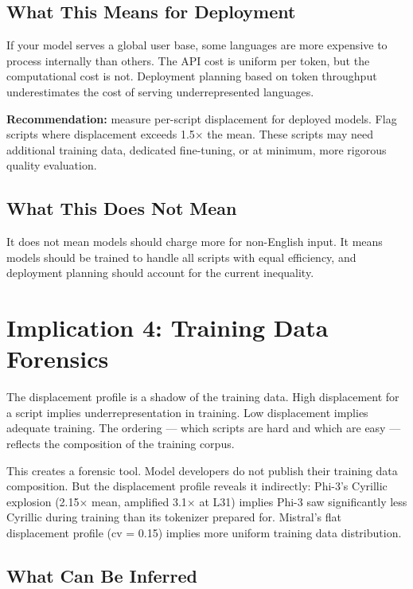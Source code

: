 \documentclass[11pt,a4paper]{article}
\begin{document}
\subsection{What This Means for Deployment}

If your model serves a global user base, some languages are more expensive to process internally than others. The API cost is uniform per token, but the computational cost is not. Deployment planning based on token throughput underestimates the cost of serving underrepresented languages.

\textbf{Recommendation:} measure per-script displacement for deployed models. Flag scripts where displacement exceeds 1.5$\times$ the mean. These scripts may need additional training data, dedicated fine-tuning, or at minimum, more rigorous quality evaluation.

\subsection{What This Does Not Mean}

It does not mean models should charge more for non-English input. It means models should be trained to handle all scripts with equal efficiency, and deployment planning should account for the current inequality.

\section{Implication 4: Training Data Forensics}

The displacement profile is a shadow of the training data. High displacement for a script implies underrepresentation in training. Low displacement implies adequate training. The ordering --- which scripts are hard and which are easy --- reflects the composition of the training corpus.

This creates a forensic tool. Model developers do not publish their training data composition. But the displacement profile reveals it indirectly: Phi-3's Cyrillic explosion (2.15$\times$ mean, amplified 3.1$\times$ at L31) implies Phi-3 saw significantly less Cyrillic during training than its tokenizer prepared for. Mistral's flat displacement profile (cv = 0.15) implies more uniform training data distribution.

\subsection{What Can Be Inferred}
\end{document}
